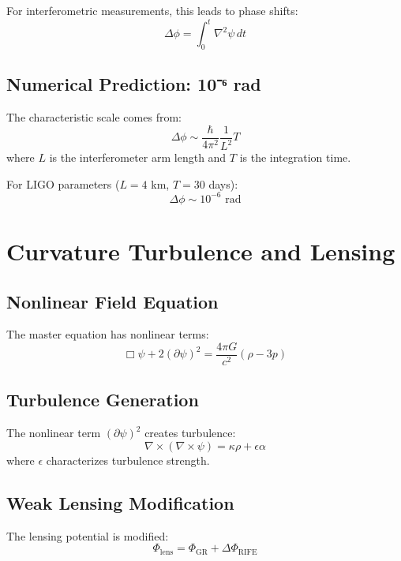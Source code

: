 \documentclass[11pt]{article}
\begin{document}
For interferometric measurements, this leads to phase shifts:
\begin{equation}
\Delta\phi = \int_0^t \nabla^2\psi \, dt
\end{equation}

\subsection{Numerical Prediction: 10⁻⁶ rad}
The characteristic scale comes from:
\begin{equation}
\Delta\phi \sim \frac{\hbar}{4\pi^2}\frac{1}{L^2}T
\end{equation}
where $L$ is the interferometer arm length and $T$ is the integration time.

For LIGO parameters ($L = 4$ km, $T = 30$ days):
\begin{equation}
\Delta\phi \sim 10^{-6} \text{ rad}
\end{equation}

\section{Curvature Turbulence and Lensing}

\subsection{Nonlinear Field Equation}
The master equation has nonlinear terms:
\begin{equation}
\Box\psi + 2(\partial\psi)^2 = \frac{4\pi G}{c^2}(\rho - 3p)
\end{equation}

\subsection{Turbulence Generation}
The nonlinear term $(\partial\psi)^2$ creates turbulence:
\begin{equation}
\nabla \times (\nabla \times \psi) = \kappa\rho + \epsilon\alpha
\end{equation}
where $\epsilon$ characterizes turbulence strength.

\subsection{Weak Lensing Modification}
The lensing potential is modified:
\begin{equation}
\Phi_{\text{lens}} = \Phi_{\text{GR}} + \Delta\Phi_{\text{RIFE}}
\end{equation}
\end{document}
